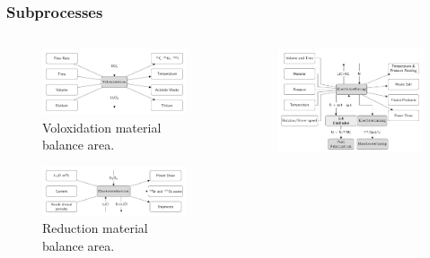 \begin{frame}
\frametitle{Subprocesses}
\begin{columns}
	\begin{column}{.5\textwidth}
		\begin{figure} 
			\centering
			\includegraphics[width=0.9\linewidth]{volox}
			\caption{Voloxidation material balance area.}
			\label{fig:volox}
		\end{figure}
		\begin{figure} 
			\centering
			\includegraphics[width=0.9\linewidth]{reduction}
			\caption{Reduction material balance area.}
			\label{fig:reduction}
		\end{figure}
	\end{column}
	\begin{column}{.5\textwidth}
		\begin{figure}
			\centering
			\includegraphics[width=0.9\linewidth]{refining}

\end{figure}
\end{column}
\end{columns}
\end{frame}
